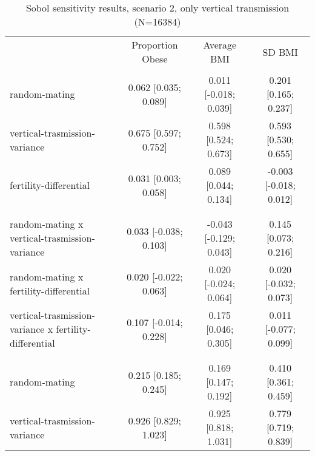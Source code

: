 
    \begin{table}[htp]
    \renewcommand{\arraystretch}{1.3}
    \setlength{\tabcolsep}{2pt}
    \caption{Sobol sensitivity results, scenario 2, only vertical transmission (N=16384)}
    \label{tab:sobol-vt}
    \footnotesize
    \centering
    \begin{threeparttable}
    \begin{tabular}{lccc}
    \hline
    \addlinespace
    & Proportion Obese & Average BMI & SD BMI \\
    \addlinespace
    \hline
    \addlinespace[6pt]
    \multicolumn{4}{l}{\hspace{1em} S1} \\
\hspace{1.5em} random-mating & 0.062 [0.035; 0.089]   & 0.011 [-0.018; 0.039]   & 0.201 [0.165; 0.237] \\
	  \hspace{1.5em} vertical-trasmission-variance & 0.675 [0.597; 0.752]   & 0.598 [0.524; 0.673]   & 0.593 [0.530; 0.655] \\
	  \hspace{1.5em} fertility-differential & 0.031 [0.003; 0.058]   & 0.089 [0.044; 0.134]   & -0.003 [-0.018; 0.012] \\
	 \\
    \addlinespace[12pt]
    \multicolumn{4}{l}{\hspace{1em} S2} \\ 
\hspace{1.5em} random-mating x vertical-trasmission-variance & 0.033 [-0.038; 0.103]   & -0.043 [-0.129; 0.043]   & 0.145 [0.073; 0.216] \\
	  \hspace{1.5em} random-mating x fertility-differential & 0.020 [-0.022; 0.063]   & 0.020 [-0.024; 0.064]   & 0.020 [-0.032; 0.073] \\
	  \hspace{1.5em} vertical-trasmission-variance x fertility-differential & 0.107 [-0.014; 0.228]   & 0.175 [0.046; 0.305]   & 0.011 [-0.077; 0.099] \\
	 \\
    \addlinespace[12pt]
    \multicolumn{4}{l}{\hspace{1em} ST} \\ 
\hspace{1.5em} random-mating & 0.215 [0.185; 0.245]   & 0.169 [0.147; 0.192]   & 0.410 [0.361; 0.459] \\
	  \hspace{1.5em} vertical-trasmission-variance & 0.926 [0.829; 1.023]   & 0.925 [0.818; 1.031]   & 0.779 [0.719; 0.839] \\

\end{tabular}
\end{threeparttable}
\end{table}
